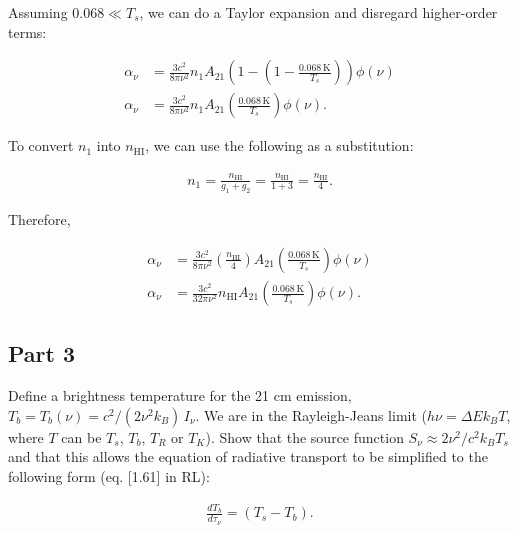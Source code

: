 \documentclass[12pt]{article}
\begin{document}
Assuming $0.068 \ll T_s$, we can do a Taylor expansion and disregard higher-order terms:

\begin{equation*}
\begin{split}
\alpha_\nu &= \frac{3c^2}{8\pi\nu^2}n_1A_{21}\left(1-\left(1-\frac{0.068\,\mathrm{K}}{T_s}\right)\right)\phi(\nu)\\
\alpha_\nu &= \frac{3c^2}{8\pi\nu^2}n_1A_{21}\left(\frac{0.068\,\mathrm{K}}{T_s}\right)\phi(\nu).
\end{split}
\end{equation*}

To convert $n_1$ into $n_\mathrm{HI}$, we can use the following as a substitution:

\begin{align*}
n_1 = \frac{n_\mathrm{HI}}{g_1+g_2} = \frac{n_\mathrm{HI}}{1+3} = \frac{n_\mathrm{HI}}{4}.
\end{align*}

Therefore,

\begin{equation*}
\begin{split}
\alpha_\nu &= \frac{3c^2}{8\pi\nu^2}\left(\frac{n_\mathrm{HI}}{4}\right)A_{21}\left(\frac{0.068\,\mathrm{K}}{T_s}\right)\phi(\nu)\\
\alpha_\nu &= \frac{3c^2}{32\pi\nu^2}n_\mathrm{HI}A_{21}\left(\frac{0.068\,\mathrm{K}}{T_s}\right)\phi(\nu).
\end{split}
\end{equation*}


\subsection*{Part 3}

Define a brightness temperature for the 21 cm emission, $T_b = T_b(\nu) = c^2/(2\nu^2k_B)\,I_\nu$. We are in the Rayleigh-Jeans limit ($h\nu = \Delta E k_BT$, where $T$ can be $T_s$, $T_b$, $T_R$ or $T_K$). Show that the source function $S_\nu \approx 2\nu^2/c^2k_BT_s$ and that this allows the equation of radiative transport to be simplified to the following form (eq. [1.61] in RL):

\begin{align*}
\frac{dT_b}{d\tau_\nu} = (T_s - T_b).
\end{align*}
\end{document}
